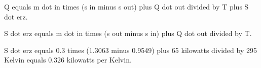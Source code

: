 Q equals m dot in times (s in minus s out) plus Q dot out divided by T plus S dot erz.  

S dot erz equals m dot in times (s out minus s in) plus Q dot out divided by T.  

S dot erz equals 0.3 times (1.3063 minus 0.9549) plus 65 kilowatts divided by 295 Kelvin equals 0.326 kilowatts per Kelvin.